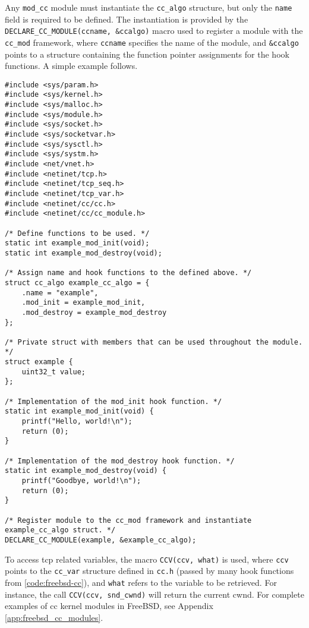 Any \lstinline{mod_cc} module must instantiate the \lstinline{cc_algo} structure, but only the \lstinline{name} field is required to be defined. The instantiation is provided by the \lstinline{DECLARE_CC_MODULE(ccname, &ccalgo)} macro used to register a module with the \lstinline{cc_mod} framework, where \lstinline{ccname} specifies the name of the module, and \lstinline{&ccalgo} points to a structure containing the function pointer assignments for the hook functions. A simple example follows.

\begin{code}
\begin{verbatim}
#include <sys/param.h>
#include <sys/kernel.h>
#include <sys/malloc.h>
#include <sys/module.h>
#include <sys/socket.h>
#include <sys/socketvar.h>
#include <sys/sysctl.h>
#include <sys/systm.h>
#include <net/vnet.h>
#include <netinet/tcp.h>
#include <netinet/tcp_seq.h>
#include <netinet/tcp_var.h>
#include <netinet/cc/cc.h>
#include <netinet/cc/cc_module.h>

/* Define functions to be used. */
static int example_mod_init(void);
static int example_mod_destroy(void);

/* Assign name and hook functions to the defined above. */
struct cc_algo example_cc_algo = {
    .name = "example",
    .mod_init = example_mod_init,
    .mod_destroy = example_mod_destroy
};

/* Private struct with members that can be used throughout the module. */
struct example {
    uint32_t value;
};

/* Implementation of the mod_init hook function. */
static int example_mod_init(void) {
    printf("Hello, world!\n");
    return (0);
}

/* Implementation of the mod_destroy hook function. */
static int example_mod_destroy(void) {
    printf("Goodbye, world!\n");
    return (0);
}

/* Register module to the cc_mod framework and instantiate example_cc_algo struct. */
DECLARE_CC_MODULE(example, &example_cc_algo);
\end{verbatim}
\label{code:freebsd-cc}
\end{code}

To access \gls{tcp} related variables, the macro \lstinline{CCV(ccv, what)} is used, where \lstinline{ccv} points to the \lstinline{cc_var} structure defined in \lstinline{cc.h} (passed by many hook functions from \ref{code:freebsd-cc}), and \lstinline{what} refers to the variable to be retrieved. For instance, the call \lstinline{CCV(ccv, snd_cwnd)} will return the current \gls{cwnd}. For complete examples of \gls{cc} kernel modules in FreeBSD, see Appendix \ref{app:freebsd_cc_modules}.









